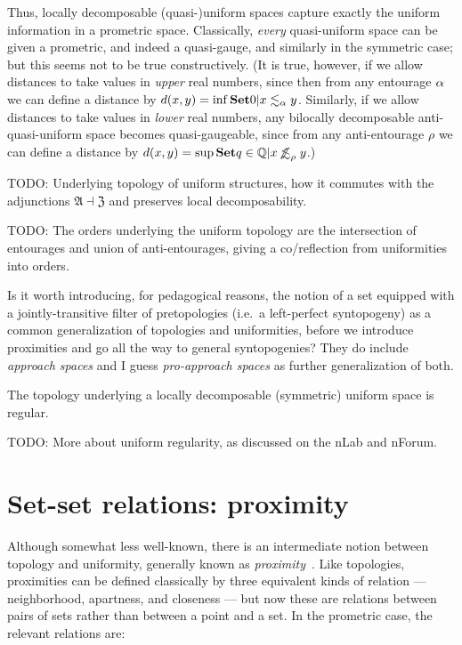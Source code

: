 \documentclass{article}
\def\oapt{\mathrel{\!\not\,\not\lesssim}}
\def\leapx{\lesssim}
\def\ent#1{\leapx_{#1}}
\def\aent#1{\oapt_{#1}}
\def\anti{\mathfrak{A}}
\def\neigh{\mathfrak{Z}}
\begin{document}
Thus, locally decomposable (quasi-)uniform spaces capture exactly the uniform information in a prometric space.
Classically, \emph{every} quasi-uniform space can be given a prometric, and indeed a quasi-gauge, and similarly in the symmetric case; but this seems not to be true constructively.
(It is true, however, if we allow distances to take values in \emph{upper} real numbers, since then from any entourage $\alpha$ we can define a distance by $d(x,y) = \inf\setof{ 0 | x\ent\al y}$.
Similarly, if we allow distances to take values in \emph{lower} real numbers, any bilocally decomposable anti-quasi-uniform space becomes quasi-gaugeable, since from any anti-entourage $\rho$ we can define a distance by $d(x,y) = \sup\setof{ q\in\mathbb{Q} | x\aent\rho y }$.)

\begin{thm}
  TODO: Underlying topology of uniform structures, how it commutes with the adjunctions $\anti\dashv \neigh$ and preserves local decomposability.
\end{thm}

\begin{thm}
  TODO: The orders underlying the uniform topology are the intersection of entourages and union of anti-entourages, giving a co/reflection from uniformities into orders.
\end{thm}

Is it worth introducing, for pedagogical reasons, the notion of a set equipped with a jointly-transitive filter of pretopologies (i.e.\ a left-perfect syntopogeny) as a common generalization of topologies and uniformities, before we introduce proximities and go all the way to general syntopogenies?
They do include \emph{approach spaces} and I guess \emph{pro-approach spaces} as further generalization of both.

\begin{thm}
  The topology underlying a locally decomposable (symmetric) uniform space is regular.
\end{thm}

TODO: More about uniform regularity, as discussed on the nLab and nForum.


\section{Set-set relations: proximity}
\label{sec:set-set}
\label{sec:proximity}

Although somewhat less well-known, there is an intermediate notion between topology and uniformity, generally known as \emph{proximity}~\cite{proximity-spaces}.
Like topologies, proximities can be defined classically by three equivalent kinds of relation --- neighborhood, apartness, and closeness --- but now these are relations between pairs of sets rather than between a point and a set.
In the prometric case, the relevant relations are:
\end{document}
